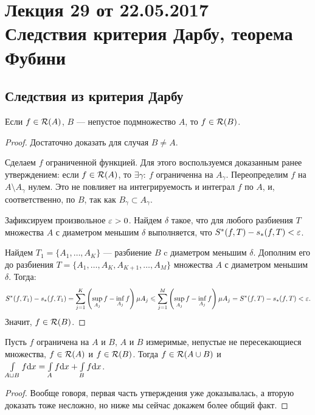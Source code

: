 \section{Лекция 29 от 22.05.2017 \\ Следствия критерия Дарбу, теорема Фубини}

\subsection{Следствия из критерия Дарбу}

\begin{Statement}
Если $f \in \mathcal{R}(A)$, $B$ --- непустое подмножество $A$, то $f \in \mathcal{R}(B)$.
\end{Statement}
\begin{proof}
Достаточно доказать для случая $B \neq A$.

Сделаем $f$ ограниченной функцией. Для этого воспользуемся доказанным ранее утверждением: если $f \in \mathcal{R}(A)$, то $\exists \gamma:\ f$ ограниченна на $A_\gamma$. Переопределим $f$ на $A \setminus A_\gamma$ нулем. Это не повлияет на интегрируемость и интеграл $f$ по $A$, и, соответственно, по $B$, так как $B_\gamma \subset A_\gamma$.

Зафиксируем произвольное $\varepsilon > 0$. Найдем $\delta$ такое, что для любого разбиения $T$ множества $A$ с диаметром меньшим $\delta$ выполняется, что $S^*(f, T) - s_*(f, T) < \varepsilon$.

Найдем $T_1 = \{ A_1, \ldots, A_K \}$ --- разбиение $B$ c диаметром меньшим $\delta$. Дополним его до разбиения $T = \{ A_1, \ldots, A_K, A_{K+1}, \ldots, A_M \}$ множества $A$ с диаметром меньшим $\delta$. Тогда:
\begin{gather*}
S^*(f, T_1) - s_*(f, T_1) = \sum\limits_{j = 1}^K\left( \sup\limits_{A_j}f - \inf\limits_{A_j}f \right)\mu A_j \leqslant \sum\limits_{j = 1}^M\left( \sup\limits_{A_j}f - \inf\limits_{A_j}f \right)\mu A_j = S^*(f, T) - s_*(f, T) < \varepsilon.
\end{gather*}
Значит, $f \in \mathcal{R}(B)$.
\end{proof}

\begin{Statement}
Пусть $f$ ограничена на $A$ и $B$, $A$ и $B$ измеримые, непустые не пересекающиеся множества, $f \in \mathcal{R}(A)$ и $f \in \mathcal{R}(B)$. Тогда $f \in \mathcal{R}(A \cup B)$ и $\int\limits_{A \sqcup B}f \mathrm{d} x = \int\limits_A f \mathrm{d} x + \int\limits_B f \mathrm{d} x$.
\end{Statement}
\begin{proof}
Вообще говоря, первая часть утверждения уже доказывалась, а вторую доказать тоже несложно, но ниже мы сейчас докажем более общий факт.
\end{proof}

